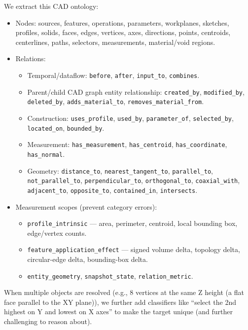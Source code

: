 \documentclass[10pt]{article}
\begin{document}
We extract this CAD ontology:
\begin{itemize}
  \item Nodes: sources, features, operations, parameters, workplanes, sketches, profiles, solids, faces, edges, vertices, axes, directions, points, centroids, centerlines, paths, selectors, measurements, material/void regions.
  \item Relations:
  \begin{itemize}
    \item Temporal/dataflow: \texttt{before}, \texttt{after}, \texttt{input\_to}, \texttt{combines}.
    \item Parent/child CAD graph entity relationship: \texttt{created\_by}, \texttt{modified\_by}, \texttt{deleted\_by}, \texttt{adds\_material\_to}, \texttt{removes\_material\_from}.
    \item Construction: \texttt{uses\_profile}, \texttt{used\_by}, \texttt{parameter\_of}, \texttt{selected\_by}, \texttt{located\_on}, \texttt{bounded\_by}.
    \item Measurement: \texttt{has\_measurement}, \texttt{has\_centroid}, \texttt{has\_coordinate}, \texttt{has\_normal}.
    \item Geometry: \texttt{distance\_to}, \texttt{nearest\_tangent\_to}, \texttt{parallel\_to}, \texttt{not\_parallel\_to}, \texttt{perpendicular\_to}, \texttt{orthogonal\_to}, \texttt{coaxial\_with}, \texttt{adjacent\_to}, \texttt{opposite\_to}, \texttt{contained\_in}, \texttt{intersects}.
  \end{itemize}
  \item Measurement scopes (prevent category errors):
  \begin{itemize}
    \item \texttt{profile\_intrinsic} --- area, perimeter, centroid, local bounding box, edge/vertex counts.
    \item \texttt{feature\_application\_effect} --- signed volume delta, topology delta, circular-edge delta, bounding-box delta.
    \item \texttt{entity\_geometry}, \texttt{snapshot\_state}, \texttt{relation\_metric}.
  \end{itemize}
\end{itemize}

When multiple objects are resolved (e.g., 8 vertices at the same Z height (a flat face parallel to the XY plane)), we further add classifiers like ``select the 2nd highest on Y and lowest on X axes'' to make the target unique (and further challenging to reason about).
\end{document}
